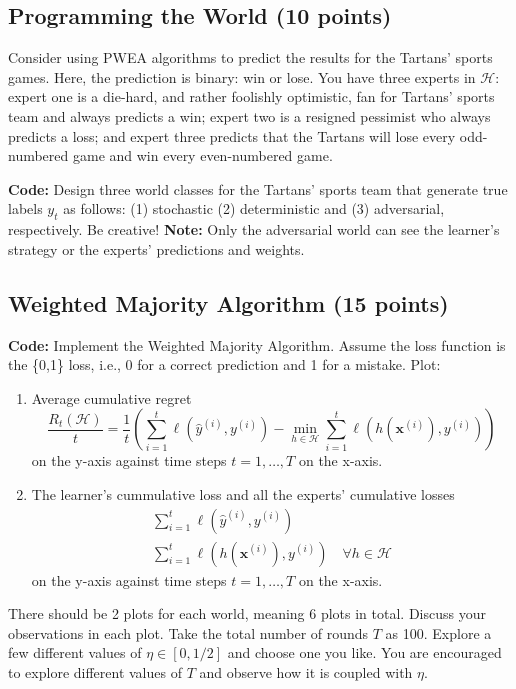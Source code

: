 \documentclass{article}
\begin{document}
\subsection{Programming the World (10 points)}
Consider using PWEA algorithms to predict the results for the Tartans' sports games. Here, the prediction is binary: win or lose. You have three experts in $\mathcal{H}$: expert one is a die-hard, and rather foolishly optimistic, fan for Tartans' sports team and always predicts a win; expert two is a resigned pessimist who always predicts a loss; and expert three predicts that the Tartans will lose every odd-numbered game and win every even-numbered game.

\noindent\textbf{Code:} Design three world classes for the Tartans' sports team that generate true labels $y_t$ as follows: (1) stochastic (2) deterministic and (3) adversarial, respectively. Be creative! \textbf{Note:} Only the adversarial world can see the learner's strategy or the experts' predictions and weights.


\subsection{Weighted Majority Algorithm (15 points)} \label{q-wma}
\textbf{Code:} Implement the Weighted Majority Algorithm. Assume the loss function is the \{0,1\} loss, i.e., 0 for a correct prediction and 1 for a mistake. Plot:
\begin{enumerate}
    \item Average cumulative regret
    \begin{equation}
        \frac{R_t(\mathcal{H})}{t} = \frac{1}{t} \left(\sum_{i = 1}^t \ell(\hat y^{(i)}, y^{(i)}) - \min_{h \in \mathcal{H}}\sum_{i=1}^t \ell(h(\mathbf{x}^{(i)}), y^{(i)})\right) \nonumber
    \end{equation}
    on the y-axis against time steps $t = 1, \dotsc, T$ on the x-axis.
    \item The learner's cummulative loss and all the experts' cumulative losses
    \begin{gather}
        \sum_{i=1}^t \ell(\hat y^{(i)}, y^{(i)}) \nonumber \\
       \sum_{i=1}^t \ell(h(\mathbf{x}^{(i)}), y^{(i)}) \quad \forall h \in \mathcal{H} \nonumber 
    \end{gather}
    on the y-axis against time steps $t = 1, \dotsc, T$ on the x-axis.
\end{enumerate}
There should be 2 plots for each world, meaning 6 plots in total. Discuss your observations in each plot. Take the total number of rounds $T$ as 100. Explore a few different values of $\eta \in [0,1/2]$ and choose one you like. You are encouraged to explore different values of $T$ and observe how it is coupled with $\eta$. 
\end{document}
